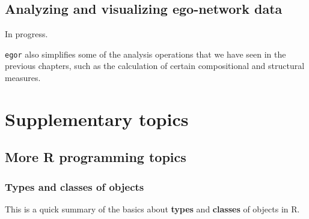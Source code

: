 \documentclass[
]{book}
\begin{document}
\hypertarget{analyzing-and-visualizing-ego-network-data}{%
\section{Analyzing and visualizing ego-network data}\label{analyzing-and-visualizing-ego-network-data}}

In progress.

\texttt{egor} also simplifies some of the analysis operations that we have seen in the previous chapters, such as the calculation of certain compositional and structural measures.

\hypertarget{supplementary}{%
\chapter{Supplementary topics}\label{supplementary}}

\hypertarget{more-r-programming-topics}{%
\section{More R programming topics}\label{more-r-programming-topics}}

\hypertarget{types-and-classes-of-objects}{%
\subsection{Types and classes of objects}\label{types-and-classes-of-objects}}

This is a quick summary of the basics about \textbf{types} and \textbf{classes} of objects in R.
\end{document}
